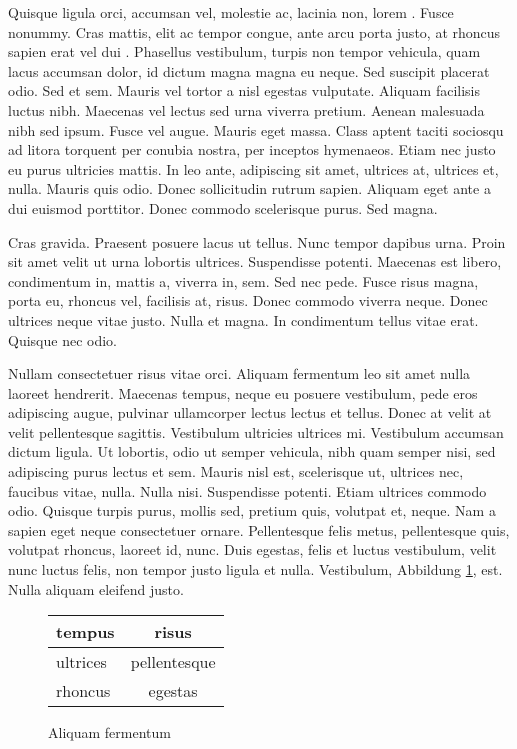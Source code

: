 Quisque ligula orci, accumsan vel, molestie ac, lacinia non, lorem . Fusce nonummy. Cras mattis, elit ac tempor congue, ante arcu porta justo, at rhoncus sapien erat vel dui \cite{kop02}. Phasellus vestibulum, turpis non tempor vehicula, quam lacus accumsan dolor, id dictum magna magna eu neque. Sed suscipit placerat odio. Sed et sem. Mauris vel tortor a nisl egestas vulputate. Aliquam facilisis luctus nibh. Maecenas vel lectus sed urna viverra pretium. Aenean malesuada nibh sed ipsum. Fusce vel augue. Mauris eget massa. Class aptent taciti sociosqu ad litora torquent per conubia nostra, per inceptos hymenaeos. Etiam nec justo eu purus ultricies mattis. In leo ante, adipiscing sit amet, ultrices at, ultrices et, nulla. Mauris quis odio. Donec sollicitudin rutrum sapien. Aliquam eget ante a dui euismod porttitor. Donec commodo scelerisque purus. Sed magna.

Cras gravida. Praesent posuere lacus ut tellus. Nunc tempor dapibus urna. Proin sit amet velit ut urna lobortis ultrices. Suspendisse potenti. Maecenas est libero, condimentum in, mattis a, viverra in, sem. Sed nec pede. Fusce risus magna, porta eu, rhoncus vel, facilisis at, risus. Donec commodo viverra neque. Donec ultrices neque vitae justo. Nulla et magna. In condimentum tellus vitae erat. Quisque nec odio.


Nullam consectetuer risus vitae orci. Aliquam fermentum leo sit amet nulla laoreet hendrerit. Maecenas tempus, neque eu posuere vestibulum, pede eros adipiscing augue, pulvinar ullamcorper lectus lectus et tellus. Donec at velit at velit pellentesque sagittis. Vestibulum ultricies ultrices mi. Vestibulum accumsan dictum ligula. Ut lobortis, odio ut semper vehicula, nibh quam semper nisi, sed adipiscing purus lectus et sem. Mauris nisl est, scelerisque ut, ultrices nec, faucibus vitae, nulla. Nulla nisi. Suspendisse potenti. Etiam ultrices commodo odio. Quisque turpis purus, mollis sed, pretium quis, volutpat et, neque. Nam a sapien eget neque consectetuer ornare. Pellentesque felis metus, pellentesque quis, volutpat rhoncus, laoreet id, nunc. Duis egestas, felis et luctus vestibulum, velit nunc luctus felis, non tempor justo ligula et nulla. Vestibulum, Abbildung \ref{fig:tabelle}, est. Nulla aliquam eleifend justo.

\begin{figure}[htb]
  \centering
  \begin{tabular}{|l|c|}
    \hline
    \textbf{tempus} & \textbf{risus} \\ \hline
    ultrices & pellentesque \\
    rhoncus & egestas \\
    \hline
  \end{tabular}
  \caption{Aliquam fermentum}\label{fig:tabelle}
\end{figure}

